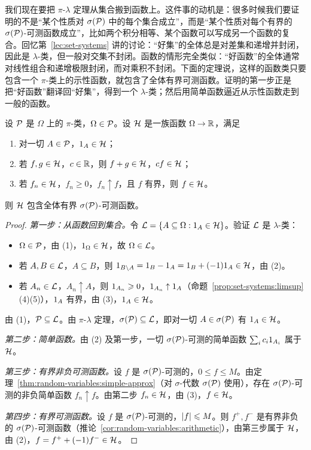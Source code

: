 
我们现在要把 $\pi$-$\lambda$ 定理从集合搬到函数上。这件事的动机是：很多时候我们要证明的不是“某个性质对 $\sigma(\mathcal{P})$ 中的每个集合成立”，而是“某个性质对每个有界的 $\sigma(\mathcal{P})$-可测函数成立”，比如两个积分相等、某个函数可以写成另一个函数的复合。回忆第~\ref{lec:set-systems} 讲的讨论：“好集”的全体总是对差集和递增并封闭，因此是 $\lambda$-类，但一般对交集不封闭。函数的情形完全类似：“好函数”的全体通常对线性组合和递增极限封闭，而对乘积不封闭。下面的定理说，这样的函数类只要包含一个 $\pi$-类上的示性函数，就包含了全体有界可测函数。证明的第一步正是把“好函数”翻译回“好集”，得到一个 $\lambda$-类；然后用简单函数逼近从示性函数走到一般的函数。

\begin{theorem}[函数形式的单调类定理]\label{thm:random-variables:monotone-class}
设 $\mathcal{P}$ 是 $\Omega$ 上的 $\pi$-类，$\Omega\in\mathcal{P}$。设 $\mathcal{H}$ 是一族函数 $\Omega\to\mathbb{R}$，满足
\begin{enumerate}
\item 对一切 $A\in\mathcal{P}$，$1_A\in\mathcal{H}$；
\item 若 $f,g\in\mathcal{H}$，$c\in\mathbb{R}$，则 $f+g\in\mathcal{H}$，$cf\in\mathcal{H}$；
\item 若 $f_n\in\mathcal{H}$，$f_n\geqslant0$，$f_n\uparrow f$，且 $f$ 有界，则 $f\in\mathcal{H}$。
\end{enumerate}
则 $\mathcal{H}$ 包含全体有界 $\sigma(\mathcal{P})$-可测函数。
\end{theorem}
\begin{proof}
\emph{第一步：从函数回到集合。}令 $\mathcal{L}=\{A\subseteq\Omega:1_A\in\mathcal{H}\}$。验证 $\mathcal{L}$ 是 $\lambda$-类：
\begin{itemize}
\item $\Omega\in\mathcal{P}$，由 (1)，$1_\Omega\in\mathcal{H}$，故 $\Omega\in\mathcal{L}$。
\item 若 $A,B\in\mathcal{L}$，$A\subseteq B$，则 $1_{B\setminus A}=1_B-1_A=1_B+(-1)1_A\in\mathcal{H}$，由 (2)。
\item 若 $A_n\in\mathcal{L}$，$A_n\uparrow A$，则 $1_{A_n}\geqslant0$，$1_{A_n}\uparrow1_A$（命题~\ref{prop:set-systems:limsup}(4)(5)），$1_A$ 有界，由 (3)，$1_A\in\mathcal{H}$。
\end{itemize}
由 (1)，$\mathcal{P}\subseteq\mathcal{L}$。由 $\pi$-$\lambda$ 定理，$\sigma(\mathcal{P})\subseteq\mathcal{L}$，即对一切 $A\in\sigma(\mathcal{P})$ 有 $1_A\in\mathcal{H}$。

\emph{第二步：简单函数。}由 (2) 及第一步，一切 $\sigma(\mathcal{P})$-可测的简单函数 $\sum_ic_i1_{A_i}$ 属于 $\mathcal{H}$。

\emph{第三步：有界非负可测函数。}设 $f$ 是 $\sigma(\mathcal{P})$-可测的，$0\leqslant f\leqslant M$。由定理~\ref{thm:random-variables:simple-approx}（对 $\sigma$-代数 $\sigma(\mathcal{P})$ 使用），存在 $\sigma(\mathcal{P})$-可测的非负简单函数 $f_n\uparrow f$。由第二步 $f_n\in\mathcal{H}$，由 (3)，$f\in\mathcal{H}$。

\emph{第四步：有界可测函数。}设 $f$ 是 $\sigma(\mathcal{P})$-可测的，$\lvert f\rvert\leqslant M$。则 $f^+,f^-$ 是有界非负的 $\sigma(\mathcal{P})$-可测函数（推论~\ref{cor:random-variables:arithmetic}），由第三步属于 $\mathcal{H}$，由 (2)，$f=f^++(-1)f^-\in\mathcal{H}$。
\end{proof}

